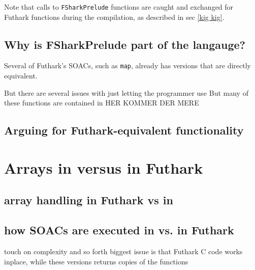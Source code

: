 Note that calls to \texttt{FSharkPrelude} functions are caught and exchanged for
Futhark functions during the \fshark{} compilation, as described in sec \ref{kig
  kig}.



\subsection*{Why is FSharkPrelude part of the \fshark{} langauge?}
Several of Futhark's SOACs, such as \texttt{map}, already has \fsharp{}
versions that are directly equivalent.

But there are several issues with just letting the \fshark{} programmer use 
But many of these \fsharp{} functions are
contained in 
HER KOMMER DER MERE








\subsection*{Arguing for Futhark-equivalent functionality}


\section{Arrays in \fsharp{} versus in Futhark}
\subsection*{array handling in Futhark vs in \fsharp{}}

\subsection*{how SOACs are executed in \fshark{} vs. in Futhark}
touch on complexity and so forth
biggest issue is that Futhark C code works inplace, while these versions
returns copies of the functions
 
